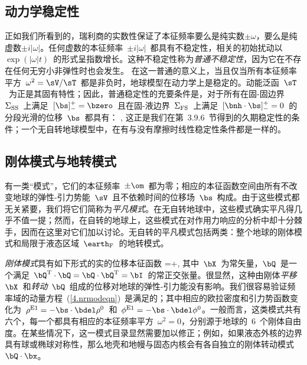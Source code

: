 \subsection{动力学稳定性}
%
%
\label{4.sec.stable}

正如我们所看到的，瑞利商的实数性保证了本征频率要么是纯实数$\pm\omega$，要么是纯虚数$\pm i|\omega |$。任何虚数的本征频率~$\pm i|\omega |$~都具有不稳定性，相关的初始扰动以~$\exp(|\omega |t)$~的形式呈指数增长。这种不稳定性称为{\em 普通不稳定性\/}，因为它在不存在任何无穷小非弹性时也会发生。
%
%
在这一普通的意义上，当且仅当所有本征频率平方~$\omega^2=\sV /\sT$~都是非负时，地球模型在动力学上是稳定的。动能泛函~$\sT$~为正是其固有特性；因此，普通稳定性的充要条件是，对于所有在固-固边界~$\Sigma_{\rm SS}$~上满足~$[\bs]^+_-=\bzero$~且在固-液边界~$\Sigma_{\rm FS}$~上满足~$[\bnh\cdot\bs]^+_-=0$~的分段光滑的位移~$\bs$~都具有：
\eq
\sV{},
\en
这正是我们在第~3.9.6~节得到的久期稳定性的条件；一个无自转地球模型中，在有与没有摩擦时线性稳定性条件都是一样的。
%
%

\renewcommand{\thesubsection}{$\!\!\!\raise1.3ex\hbox{$\star$}\!\!$
\arabic{chapter}.\arabic{section}.\arabic{subsection}}
\subsection{刚体模式与地转模式}
%
%
%
%
%
%
\label{4.sec.triv}
\renewcommand{\thesubsection}{\arabic{chapter}.\arabic{section}.\arabic{subsection}}

有一类“模式”，它们的本征频率~$\pm\om$~都为零；相应的本征函数空间由所有不改变地球的弹性-引力势能~$\sV$~且不依赖时间的位移场~$\bs$~构成。由于这些模式都无关紧要，我们将它们简称为{\em 平凡模式\/}。在无自转地球中，这些模式确实平凡得几乎不值一提；然而，在自转的地球上，这些模式在对作用力响应的分析中却十分棘手，因而在这里对它们加以讨论。无自转的平凡模式包括两类：整个地球的刚体模式和局限于液态区域~$\earth_{\rm F}$~的地转模式。

{\em 刚体模式\/}具有如下形式的实的位移本征函数
\eq
\label{4.rigids}
\bs=\bX+\bQ\cdot\bx,
\en
其中~$\bX$~为常矢量，$\bQ$~是一个满足~$\bQ^{\rm T}\cdot\bQ=\bQ\cdot\bQ^{\rm T}=\bI$~的常正交张量。很显然，这种由刚体{\em 平移\/}~$\bX$~和{\em 转动\/}~$\bQ$~组成的位移对地球的弹性-引力能没有影响。我们很容易验证频率域的动量方程~(\ref{4.nrmodeqn})~是满足的；其中相应的欧拉密度和引力势函数变化为~$\rho^{\rm E1}=-\bs\cdot\bdel\rho^0$~和~$\phi^{\rm
E1}=-\bs\cdot\bdel\phi^0$。一般而言，这类模式共有六个，每一个都具有相应的本征频率平方~$\omega^2=0$，分别源于地球的~6~个刚体自由度。在某些情况下，这一模式目录显然需要加以修正；例如，如果液态外核的边界具有球或椭球对称性，那么地壳和地幔与固态内核会有各自独立的刚体转动模式~$\bQ\cdot\bx$。

